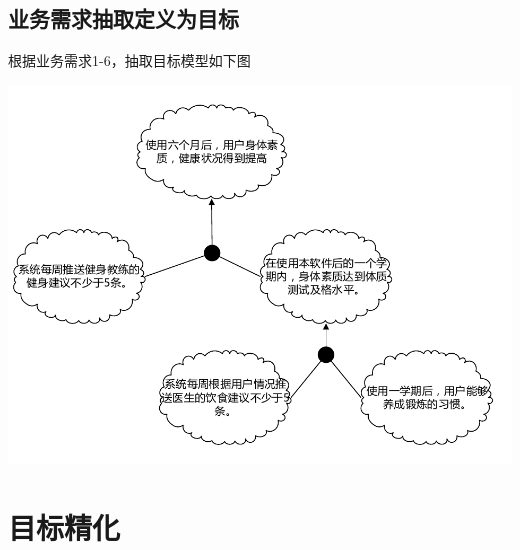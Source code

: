 \documentclass[UTF8]{ctexart}
\begin{document}
\subsection{业务需求抽取定义为目标}
根据业务需求1-6，抽取目标模型如下图

\includegraphics[scale=0.90]{br.pdf}

\section{目标精化}
\end{document}
